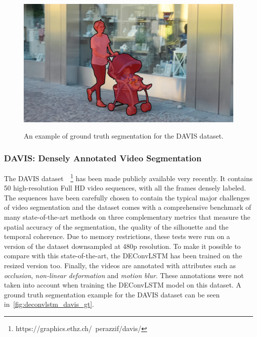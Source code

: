 \begin{figure}[t]
    \includegraphics[width=0.3\columnwidth]{img/deconvLSTM/davis_gt9.jpg}\\
    \caption{An example of ground truth segmentation for the DAVIS dataset.}
    \label{fig:deconvlstm_davis_gt}
\end{figure}

\subsubsection{DAVIS: Densely Annotated Video Segmentation}
\label{sec:deconvLSTM_davis}
The DAVIS dataset~\citep{Perazzi2016}~\footnote{
https://graphics.ethz.ch/~perazzif/davis/} has been made publicly available
very recently. It contains 50 high-resolution Full HD video sequences, with
all the frames densely labeled. The sequences have been carefully chosen to
contain the typical major challenges of video segmentation and the dataset
comes with a comprehensive benchmark of many state-of-the-art methods on
three complementary metrics that measure the spatial accuracy of the
segmentation, the quality of the silhouette and the temporal coherence. Due to
memory restrictions, these tests were run on a version of the dataset
downsampled at 480p resolution. To make it possible to compare with this
state-of-the-art, the DEConvLSTM has been trained on the resized version too.
Finally, the videos are annotated with attributes such as \textit{occlusion},
\textit{non-linear deformation} and \textit{motion blur}. These annotations
were not taken into account when training the DEConvLSTM model on this dataset.
A ground truth segmentation example for the DAVIS dataset can be seen
in~\autoref{fig:deconvlstm_davis_gt}.



